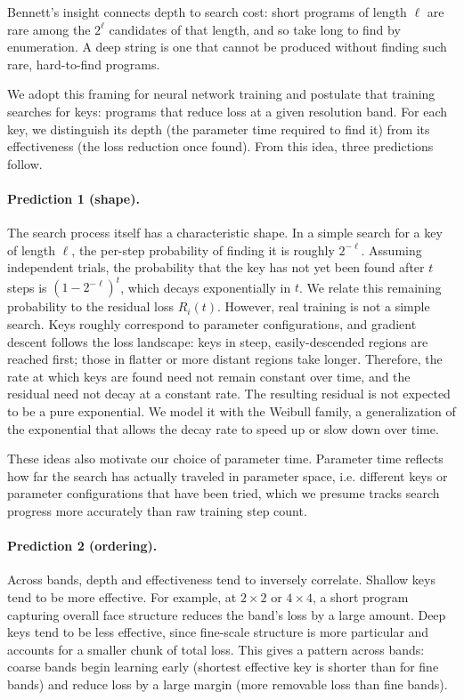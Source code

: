 \documentclass{article}
\begin{document}
Bennett's insight connects depth to search cost: short programs of
length $\ell$ are rare among the $2^\ell$ candidates of that length,
and so take long to find by enumeration. A deep string is one that cannot
be produced without finding such rare, hard-to-find programs.

We adopt this framing for neural network training and postulate that
training searches for keys: programs that reduce loss at a given
resolution band. For each key, we distinguish its depth (the parameter
time required to find it) from its effectiveness (the loss reduction
once found). From this idea, three predictions follow.

\paragraph{Prediction 1 (shape).} The search process itself has a characteristic
shape. In a simple search for a key of length $\ell$, the per-step
probability of finding it is roughly $2^{-\ell}$. Assuming independent
trials, the probability that the key has not yet been found after $t$
steps is $(1 - 2^{-\ell})^t$, which decays exponentially in
$t$. We relate this remaining probability to the residual loss $R_i(t)$.
However, real training is not a simple search. Keys roughly correspond
to parameter configurations, and gradient descent follows the loss
landscape: keys in steep, easily-descended regions are reached first;
those in flatter or more distant regions take longer. Therefore, the 
rate at which keys are found need not remain constant
over time, and the residual need not decay at a constant rate. The
resulting residual is not expected to be a pure exponential. We model
it with the Weibull family, a generalization of the exponential that
allows the decay rate to speed up or slow down over time.

These ideas also motivate our choice of parameter time. Parameter time
reflects how far the search has actually traveled in parameter space, i.e.
different keys or parameter configurations that have been tried,
which we presume tracks search progress more accurately than raw
training step count.

\paragraph{Prediction 2 (ordering).} Across bands, depth and effectiveness tend to
inversely correlate. Shallow keys tend to be more effective. For example, at
$2\times 2$ or $4\times 4$, a short program capturing overall face structure reduces the
band's loss by a large amount. Deep keys tend to be less effective,
since fine-scale structure is more particular and accounts for a smaller
chunk of total loss. This gives a pattern across bands: coarse bands
begin learning early (shortest effective key is shorter than for fine bands)
and reduce loss by a large margin (more removable loss than fine bands).
\end{document}
